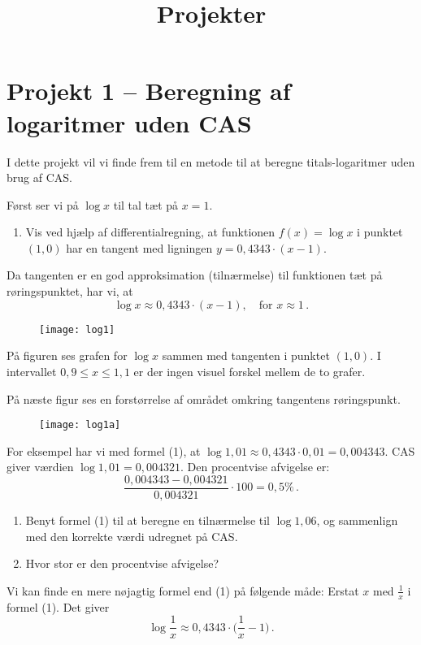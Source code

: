 \documentclass[12pt,oneside,a4paper]{article}
\title{Projekter}
\date{\vspace{-5ex}}
\theoremstyle{plain}
\begin{document}
\maketitle

\section*{Projekt 1 -- Beregning af logaritmer uden CAS}
I dette projekt vil vi finde frem til en metode til at beregne
titals-logaritmer uden brug af CAS.

Først ser vi på $\log x$ til tal tæt på $x=1$.

\begin{enumerate}[label=(\alph*)]
    \item Vis ved hjælp af differentialregning, at funktionen $f(x) = \log x$ i
        punktet $(1, 0)$ har en tangent med ligningen $y = 0,4343 \cdot (x-1)$.
\end{enumerate}
Da tangenten er en god approksimation (tilnærmelse) til funktionen tæt på
røringspunktet, har vi, at 
\[
    \tag{1}
    \log x \approx 0,4343\cdot(x-1),\quad \mbox{for $x\approx 1$}\,.
\]

\begin{figure}[H]
    \centering
    \texttt{[image: log1]}
\end{figure}
På figuren ses grafen for $\log x$ sammen med tangenten i punktet $(1, 0)$. I
intervallet $0,9\le x\le 1,1$ er der ingen visuel forskel mellem de to grafer.

På næste figur ses en forstørrelse af området omkring tangentens røringspunkt.
\begin{figure}[H]
    \centering
    \texttt{[image: log1a]}
\end{figure}

For eksempel har vi med formel (1), at $\log 1,01 \approx 0,4343\cdot 0,01 = 0,004343$.
CAS giver værdien $\log 1,01 = 0,004321$. Den procentvise afvigelse er:
\[
    \frac{0,004343-0,004321}{0,004321}\cdot 100 = 0,5 \% \,.
\]

\begin{enumerate}[label=(\alph*), resume]
    \item Benyt formel (1) til at beregne en tilnærmelse til $\log
        1,06$, og sammenlign med den korrekte værdi udregnet på CAS.
    \item Hvor stor er den procentvise afvigelse?
\end{enumerate}

Vi kan finde en mere nøjagtig formel end (1) på følgende måde: Erstat $x$ med
$\frac1x$ i formel (1). Det giver
\[
    \tag{2}
    \log\frac1x \approx 0,4343\cdot\Big(\frac1x-1\Big)\,.
\]
\end{document}
